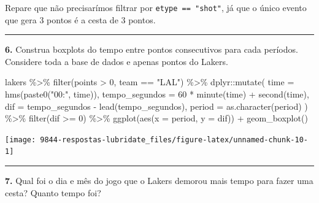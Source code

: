 \documentclass[
]{book}
\newenvironment{Shaded}{\begin{snugshade}}{\end{snugshade}}
\newcommand{\AttributeTok}[1]{\textcolor[rgb]{0.77,0.63,0.00}{#1}}
\newcommand{\DecValTok}[1]{\textcolor[rgb]{0.00,0.00,0.81}{#1}}
\newcommand{\FunctionTok}[1]{\textcolor[rgb]{0.00,0.00,0.00}{#1}}
\newcommand{\NormalTok}[1]{#1}
\newcommand{\SpecialCharTok}[1]{\textcolor[rgb]{0.00,0.00,0.00}{#1}}
\newcommand{\StringTok}[1]{\textcolor[rgb]{0.31,0.60,0.02}{#1}}
\begin{document}
Repare que não precisarímos filtrar por \texttt{etype\ ==\ "shot"}, já que o único evento que gera 3 pontos é a cesta de 3 pontos.

\begin{center}\rule{0.5\linewidth}{0.5pt}\end{center}

\textbf{6.} Construa boxplots do tempo entre pontos consecutivos para cada períodos. Considere toda a base de dados e apenas pontos do Lakers.

\begin{Shaded}
\begin{Highlighting}[]
\NormalTok{lakers }\SpecialCharTok{\%\textgreater{}\%} 
  \FunctionTok{filter}\NormalTok{(points }\SpecialCharTok{\textgreater{}} \DecValTok{0}\NormalTok{, team }\SpecialCharTok{==} \StringTok{"LAL"}\NormalTok{) }\SpecialCharTok{\%\textgreater{}\%} 
\NormalTok{    dplyr}\SpecialCharTok{::}\FunctionTok{mutate}\NormalTok{(}
      \AttributeTok{time =} \FunctionTok{hms}\NormalTok{(}\FunctionTok{paste0}\NormalTok{(}\StringTok{"00:"}\NormalTok{, time)),}
      \AttributeTok{tempo\_segundos =} \DecValTok{60} \SpecialCharTok{*} \FunctionTok{minute}\NormalTok{(time) }\SpecialCharTok{+} \FunctionTok{second}\NormalTok{(time),}
      \AttributeTok{dif =}\NormalTok{ tempo\_segundos }\SpecialCharTok{{-}} \FunctionTok{lead}\NormalTok{(tempo\_segundos),}
      \AttributeTok{period =} \FunctionTok{as.character}\NormalTok{(period)}
\NormalTok{    ) }\SpecialCharTok{\%\textgreater{}\%} 
  \FunctionTok{filter}\NormalTok{(dif }\SpecialCharTok{\textgreater{}=} \DecValTok{0}\NormalTok{) }\SpecialCharTok{\%\textgreater{}\%} 
  \FunctionTok{ggplot}\NormalTok{(}\FunctionTok{aes}\NormalTok{(}\AttributeTok{x =}\NormalTok{ period, }\AttributeTok{y =}\NormalTok{ dif)) }\SpecialCharTok{+}
  \FunctionTok{geom\_boxplot}\NormalTok{()}
\end{Highlighting}
\end{Shaded}

\begin{center}\texttt{[image: 9844-respostas-lubridate\_files/figure-latex/unnamed-chunk-10-1]} \end{center}

\begin{center}\rule{0.5\linewidth}{0.5pt}\end{center}

\textbf{7.} Qual foi o dia e mês do jogo que o Lakers demorou mais tempo para fazer uma cesta? Quanto tempo foi?
\end{document}
